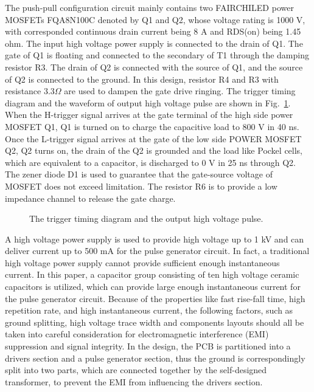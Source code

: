 \documentclass[aip,rsi,reprint,graphicx]{revtex4-1} %
\begin{document}
The push-pull configuration circuit mainly contains two FAIRCHILED power MOSFETs FQA8N100C denoted by Q1 and Q2, whose voltage rating is 1000 V, with corresponded continuous drain current being 8 A and RDS(on) being 1.45 ohm.
The input high voltage power supply is connected to the drain of Q1. The gate of Q1 is floating and connected to the secondary of T1 through the damping resistor R3.
The drain of Q2 is connected with the source of Q1, and the source of Q2 is connected to the ground.
In this design, resistor R4 and R3 with resistance $3.3 \Omega$ are used to dampen the gate drive ringing.
The trigger timing diagram and the waveform of output high voltage pulse are shown in Fig.~\ref{FIG2}.
When the H-trigger signal arrives at the gate terminal of the high side power MOSFET Q1, Q1 is turned on to charge the capacitive load to 800 V in 40 ns.
Once the L-trigger signal arrives at the gate of the low side POWER MOSFET Q2, Q2 turns on, the drain of the Q2 is grounded and the load like Pockel cells, which are equivalent to a capacitor, is discharged to 0 V in 25 ns through Q2.
The zener diode D1 is used to guarantee that the gate-source voltage of MOSFET does not exceed limitation. The resistor R6 is to provide a low impedance channel to release the gate charge.
\begin{figure}[hbt]
\caption{The trigger timing diagram and the output high voltage pulse. \label{FIG2}}%
\end{figure}

	A high voltage power supply is used to provide high voltage up to 1 kV and can deliver current up to 500 mA for the pulse generator circuit.
In fact, a traditional high voltage power supply cannot provide sufficient enough instantaneous current.
In this paper, a capacitor group consisting of ten high voltage ceramic capacitors is utilized, which can provide large enough instantaneous current for the pulse generator circuit.
Because of the properties like fast rise-fall time, high repetition rate, and high instantaneous current, the following factors,  such as ground splitting, high voltage trace width and components layouts should all be taken into careful consideration for electromagnetic interference (EMI) suppression and signal integrity.
In the design, the PCB is partitioned into a drivers section and a pulse generator section, thus the ground is correspondingly split into two parts, which are connected together by the self-designed transformer, to prevent the EMI from influencing the drivers section.
\end{document}
